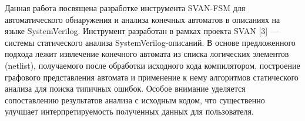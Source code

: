 Данная работа посвящена разработке инструмента SVAN-FSM для автоматического обнаружения и
анализа конечных автоматов в описаниях на языке SystemVerilog. Инструмент разработан
в рамках проекта SVAN [3] — системы статического анализа SystemVerilog-описаний.
В основе предложенного подхода лежит извлечение конечного автомата из списка
логических элементов (netlist), получаемого после обработки исходного кода компилятором,
построение графового представления автомата и применение к нему алгоритмов статического
анализа для поиска типичных ошибок. Особое внимание уделяется сопоставлению результатов
анализа с исходным кодом, что существенно улучшает интерпретируемость полученных
данных для пользователя.
